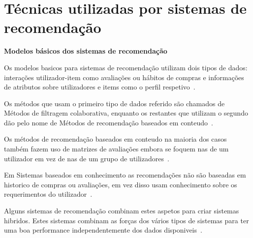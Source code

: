 \section{Técnicas utilizadas por sistemas de recomendação}

\begin{center}
\normalsize{\bfseries Modelos básicos dos sistemas de recomendação}\hfill
\end{center}


\par Os modelos basicos para sistemas de recomendação utilizam dois tipos de dados: interações utilizador-item como avaliações ou hábitos de compras e informações de atributos sobre utilizadores e items como o perfil respetivo~\cite{ref_book1}.
\par Os métodos que usam o primeiro tipo de dados referido são chamados de Métodos de filtragem colaborativa, enquanto os restantes que utilizam o segundo dão pelo nome de Métodos de recomendação baseados em conteudo~\cite{ref_book1}.
\par Os métodos de recomendação baseados em conteudo na maioria dos casos também fazem uso de matrizes de avaliações embora se foquem nas de um utilizador em vez de nas de um grupo de utilizadores~\cite{ref_book1}.
\par Em Sistemas baseados em conhecimento as recomendações não são baseadas em historico de compras ou avaliações, em vez disso usam conhecimento sobre os requerimentos do utilizador~\cite{ref_book1}.
\par Alguns sistemas de recomendação combinam estes aspetos para criar sistemas hibridos. Estes sistemas combinam as forças dos vários tipos de sistemas para ter uma boa performance independentemente dos dados disponiveis~\cite{ref_book1}.
\hfill
